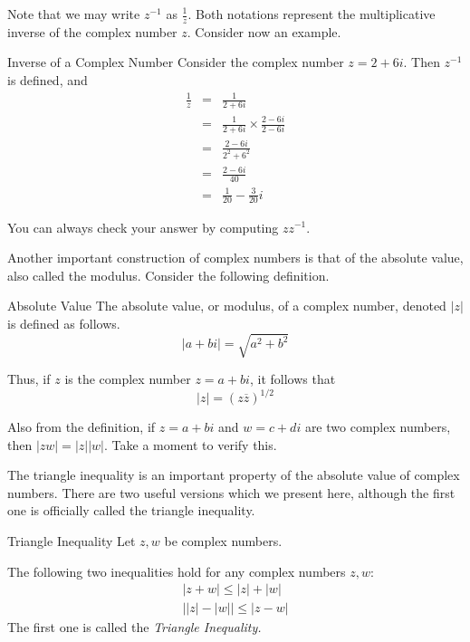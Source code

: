 Note that we may write $z^{-1}$ as $\frac{1}{z}$. Both notations represent the multiplicative inverse of the complex number $z$. Consider now an example.

\begin{example}{Inverse of a Complex Number}\label{exa:complexinverse}
Consider the complex number $z = 2 + 6i$. Then $z^{-1}$ is defined, and
\begin{eqnarray*}
 \frac{1}{z} &=& \frac{1}{2+6i}\\
 &=& \frac{1}{2+6i}\times \frac{2-6i}{2-6i} \\
 &=& \frac{2-6i}{2^2+6^2} \\
 &=& \frac{2-6i}{40} \\
 &=& \frac{1}{20} -  \frac{3}{20}i
\end{eqnarray*}

You can always check your answer by computing $zz^{-1}$.
\end{example}

Another important construction of complex numbers is that of the absolute value, also called the modulus. Consider the following definition. 

\begin{definition}{Absolute Value}\label{def:complexabsvalue}
The absolute
value, or modulus, of a complex number, denoted $\left| z \right|$ is defined as follows.
\begin{equation*}
\left| a+bi\right| =
\sqrt{a^{2}+b^{2}}
\end{equation*}
\end{definition}

Thus, if $z$ is the complex number $z=a+bi$, it follows that
\begin{equation*}
\left| z\right| =\left( z\overline{z}\right) ^{1/2}
\end{equation*}

Also from the definition, if $z=a+bi$ and $w=c+di$ are two complex numbers,
then $\left\vert zw\right\vert =\left\vert z\right\vert \left\vert
w\right\vert .$ Take a moment to verify this.

The triangle inequality
 is an important property of the absolute value
of complex numbers. There are two useful versions which we present
here, although the first one is officially called the triangle inequality. 

\begin{proposition}{Triangle Inequality}\label{prop:triangleinequalitycomplex}
Let $z,w$ be complex numbers. 

The following two inequalities hold for any  complex numbers $z,w$:
\begin{equation*}
\begin{array}{l}
\left| z+w\right| \leq \left| z\right| +\left| w\right|  \\
\left| \left| z\right| -\left| w\right| \right| \leq \left| z-w\right| 
\end{array}
\end{equation*}
The first one is called the \em{Triangle Inequality}.
\end{proposition}

